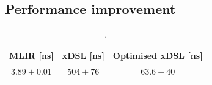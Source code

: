 \subsection{Performance improvement}
\label{sec:specialising-pattern-rewriting-performance}


\begin{table}[H]
  \caption{.}
  \label{tab:constant-folding-optimised}
  \centering
  \begin{tabular}{ccc}
    \toprule
    \textbf{MLIR [ns]} & \textbf{xDSL [ns]} & \textbf{Optimised xDSL [ns]} \\
    \midrule
    $3.89 \pm 0.01$ & $504 \pm 76$ & $63.6 \pm 40$\\
    \bottomrule
  \end{tabular}
\end{table}



